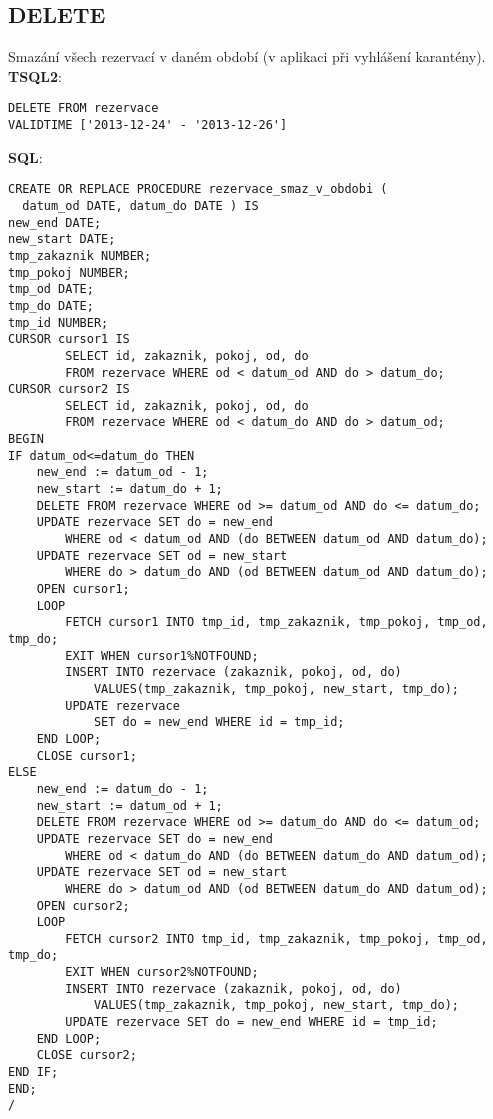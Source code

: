 \documentclass[8pt,a4paper]{article}
\begin{document}
\newpage
\subsection{DELETE}

Smazání všech rezervací v daném období (v aplikaci při vyhlášení karantény).\\

\textbf{TSQL2}:
\begin{center}
\begin{verbatim}
DELETE FROM rezervace
VALIDTIME ['2013-12-24' - '2013-12-26']
\end{verbatim}
\end{center}

\textbf{SQL}:
\begin{center}
\begin{verbatim}
CREATE OR REPLACE PROCEDURE rezervace_smaz_v_obdobi (
  datum_od DATE, datum_do DATE ) IS
new_end DATE;
new_start DATE;
tmp_zakaznik NUMBER;
tmp_pokoj NUMBER;
tmp_od DATE;
tmp_do DATE;
tmp_id NUMBER;
CURSOR cursor1 IS
        SELECT id, zakaznik, pokoj, od, do
        FROM rezervace WHERE od < datum_od AND do > datum_do;
CURSOR cursor2 IS
        SELECT id, zakaznik, pokoj, od, do
        FROM rezervace WHERE od < datum_do AND do > datum_od;
BEGIN
IF datum_od<=datum_do THEN
    new_end := datum_od - 1;
    new_start := datum_do + 1;
    DELETE FROM rezervace WHERE od >= datum_od AND do <= datum_do;
    UPDATE rezervace SET do = new_end
        WHERE od < datum_od AND (do BETWEEN datum_od AND datum_do);
    UPDATE rezervace SET od = new_start
        WHERE do > datum_do AND (od BETWEEN datum_od AND datum_do);
    OPEN cursor1;
    LOOP
        FETCH cursor1 INTO tmp_id, tmp_zakaznik, tmp_pokoj, tmp_od, tmp_do;
        EXIT WHEN cursor1%NOTFOUND;
        INSERT INTO rezervace (zakaznik, pokoj, od, do)
            VALUES(tmp_zakaznik, tmp_pokoj, new_start, tmp_do);
        UPDATE rezervace
            SET do = new_end WHERE id = tmp_id;
    END LOOP;
    CLOSE cursor1;
ELSE
    new_end := datum_do - 1;
    new_start := datum_od + 1;        
    DELETE FROM rezervace WHERE od >= datum_do AND do <= datum_od;
    UPDATE rezervace SET do = new_end
        WHERE od < datum_do AND (do BETWEEN datum_do AND datum_od);
    UPDATE rezervace SET od = new_start
        WHERE do > datum_od AND (od BETWEEN datum_do AND datum_od);
    OPEN cursor2;
    LOOP
        FETCH cursor2 INTO tmp_id, tmp_zakaznik, tmp_pokoj, tmp_od, tmp_do;
        EXIT WHEN cursor2%NOTFOUND;
        INSERT INTO rezervace (zakaznik, pokoj, od, do)
            VALUES(tmp_zakaznik, tmp_pokoj, new_start, tmp_do);
        UPDATE rezervace SET do = new_end WHERE id = tmp_id;
    END LOOP;
    CLOSE cursor2;
END IF;
END;
/
\end{verbatim}
\end{center}
\end{document}

